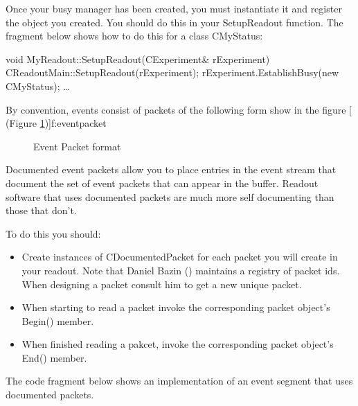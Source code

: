       Once your busy manager has been created, you must
      instantiate it and register the object you created.
      You should do this in your SetupReadout function.  The
      fragment below shows how to do this for a class
      CMyStatus:
      \begin{example}
      void
      MyReadout::SetupReadout(CExperiment\& rExperiment)
      {
	 CReadoutMain::SetupReadout(rExperiment);
	 rExperiment.EstablishBusy(new CMyStatus);
	 \ldots
      }
      \end{example}
 

      By convention, events consist of packets of the following
      form show in the figure 
      [
	 (Figure \ref{f:eventpacket})]{f:eventpacket}
	 
      \begin{figure}[htb]
	 \caption{Event Packet format}\label{f:eventpacket}
      \end{figure}
      
      Documented event packets allow you to place entries in
      the event stream that document the set of event packets
      that can appear in the buffer.  Readout software that uses
      documented packets are much more self documenting than those
      that don't.
      
      To do this you should:
      
      \begin{itemize}
	 \item Create instances of CDocumentedPacket for
	    each packet you will create in your readout.  Note
	    that Daniel Bazin 
	    ()
	    maintains a registry of packet ids. When designing a
	    packet consult him to get a new unique packet.
	 \item When starting to read a packet invoke the
	    corresponding packet object's Begin() member.
	 \item When finished reading a pakcet, invoke the
	    corresponding packet object's End() member.
      \end{itemize}
      
      The code fragment below shows an implementation of
      an event segment that uses documented packets.
      
